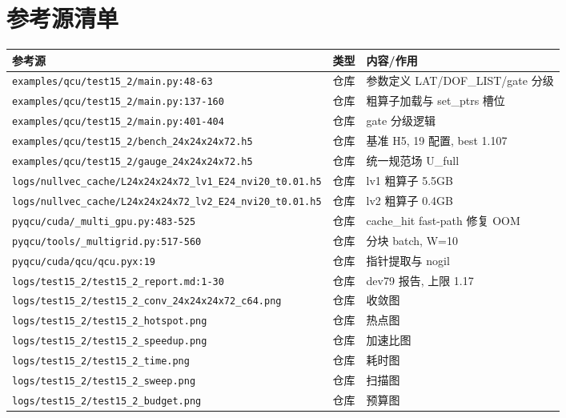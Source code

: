 \documentclass[UTF8]{ctexart}
\begin{document}
\section{参考源清单}
\begin{xltabular}{\textwidth}{llX}
\toprule
\textcolor{evidence}{参考源} & 类型 & 内容/作用 \\
\midrule
\endhead
\texttt{\nolinkurl{examples/qcu/test15_2/main.py:48-63}} & 仓库 & 参数定义 LAT/DOF\_LIST/gate 分级 \\
\texttt{\nolinkurl{examples/qcu/test15_2/main.py:137-160}} & 仓库 & 粗算子加载与 set\_ptrs 槽位 \\
\texttt{\nolinkurl{examples/qcu/test15_2/main.py:401-404}} & 仓库 & gate 分级逻辑 \\
\texttt{\nolinkurl{examples/qcu/test15_2/bench_24x24x24x72.h5}} & 仓库 & 基准 H5, 19 配置, best 1.107 \\
\texttt{\nolinkurl{examples/qcu/test15_2/gauge_24x24x24x72.h5}} & 仓库 & 统一规范场 U\_full \\
\texttt{\nolinkurl{logs/nullvec_cache/L24x24x24x72_lv1_E24_nvi20_t0.01.h5}} & 仓库 & lv1 粗算子 5.5GB \\
\texttt{\nolinkurl{logs/nullvec_cache/L24x24x24x72_lv2_E24_nvi20_t0.01.h5}} & 仓库 & lv2 粗算子 0.4GB \\
\texttt{\nolinkurl{pyqcu/cuda/_multi_gpu.py:483-525}} & 仓库 & cache\_hit fast-path 修复 OOM \\
\texttt{\nolinkurl{pyqcu/tools/_multigrid.py:517-560}} & 仓库 & 分块 batch, W=10 \\
\texttt{\nolinkurl{pyqcu/cuda/qcu/qcu.pyx:19}} & 仓库 & 指针提取与 nogil \\
\texttt{\nolinkurl{logs/test15_2/test15_2_report.md:1-30}} & 仓库 & dev79 报告, 上限 1.17 \\
\texttt{\nolinkurl{logs/test15_2/test15_2_conv_24x24x24x72_c64.png}} & 仓库 & 收敛图 \\
\texttt{\nolinkurl{logs/test15_2/test15_2_hotspot.png}} & 仓库 & 热点图 \\
\texttt{\nolinkurl{logs/test15_2/test15_2_speedup.png}} & 仓库 & 加速比图 \\
\texttt{\nolinkurl{logs/test15_2/test15_2_time.png}} & 仓库 & 耗时图 \\
\texttt{\nolinkurl{logs/test15_2/test15_2_sweep.png}} & 仓库 & 扫描图 \\
\texttt{\nolinkurl{logs/test15_2/test15_2_budget.png}} & 仓库 & 预算图 \\

\end{xltabular}
\end{document}
